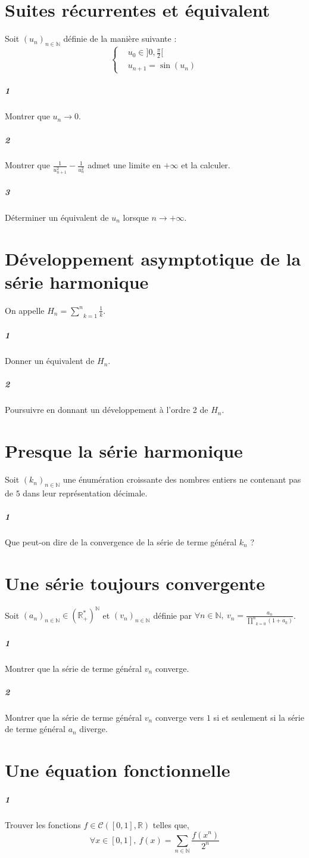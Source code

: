 \documentclass[10pt,a4paper]{article}
\begin{document}
\section{Suites récurrentes et équivalent}
Soit $(u_n)_{n \in \mathbb{N}}$ définie de la manière suivante :
\begin{equation*}
\left\lbrace
\begin{aligned}
& u_0 \in ]0,\frac{\pi}{2}[\\
& u_{n+1}=\sin(u_n)
\end{aligned}
\right.
\end{equation*}
\subparagraph{1}Montrer que $u_n \rightarrow 0$.
\subparagraph{2}Montrer que $\frac{1}{u_{n+1}^2}-\frac{1}{u_n^2}$ admet une limite en $+\infty$ et la calculer.
\subparagraph{3}Déterminer un équivalent de $u_n$ lorsque $n \rightarrow +\infty$.

\section{Développement asymptotique de la série harmonique}
On appelle $H_n= \underset{k=1}{\overset{n}{\sum}}\frac{1}{k}$.
\subparagraph{1}Donner un équivalent de $H_n$.
\subparagraph{2}Poursuivre en donnant un développement à l'ordre 2 de $H_n$.

\section{Presque la série harmonique}
Soit $(k_n)_{n \in \mathbb{N}}$ une énumération croissante des nombres entiers ne contenant pas de $5$ dans leur représentation décimale.
\subparagraph{1}Que peut-on dire de la convergence de la série de terme général $k_n$ ?

\section{Une série toujours convergente}
Soit $(a_n)_{n \in \mathbb{N}} \in \left(\mathbb{R}_+^* \right)^{\mathbb{N}}$ et $(v_n)_{n \in \mathbb{N}}$ définie par ${ \forall n \in \mathbb{N}, \ v_n = \frac{a_n}{\underset{k=0}{\overset{n}{\prod}}(1+a_k)}}$.
\subparagraph{1}Montrer que la série de terme général $v_n$ converge.
\subparagraph{2}Montrer que la série de terme général $v_n$ converge vers $1$ si et seulement si la série de terme général $a_n$ diverge.

\section{Une équation fonctionnelle}
\subparagraph{1}Trouver les fonctions $f \in \mathcal{C}\left( [0,1], \mathbb{R} \right)$ telles que,
\begin{equation}
\forall x \in [0,1], \ f(x) = \underset{n \in \mathbb{N}}{\sum} \frac{f(x^n)}{2^n}
\end{equation}
\end{document}
